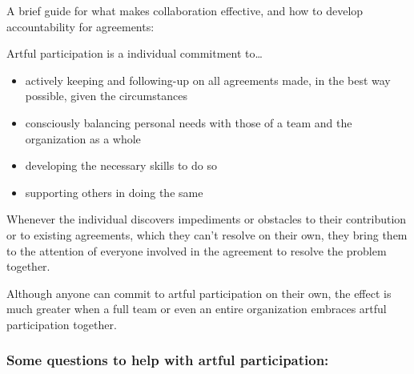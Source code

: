 A brief guide for what makes collaboration effective, and how to develop accountability for agreements:

Artful participation is a individual commitment to…

\begin{itemize}
\item actively keeping and following-up on all agreements made, in the best way possible, given the circumstances

\item consciously balancing personal needs with those of a team and the organization as a whole

\item developing the necessary skills to do so

\item supporting others in doing the same

\end{itemize}

Whenever the individual discovers impediments or obstacles to their contribution or to existing agreements, which they can't resolve on their own, they bring them to the attention of everyone involved in the agreement to resolve the problem together.

Although anyone can commit to artful participation on their own, the effect is much greater when a full team or even an entire organization embraces artful participation together.

\subsubsection{Some questions to help with artful participation:}
\label{somequestionstohelpwithartfulparticipation:}

